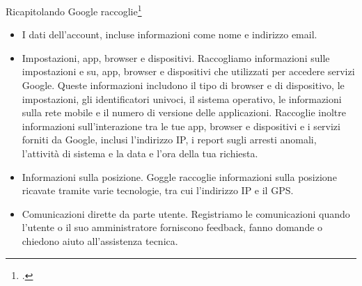 Ricapitolando Google raccoglie\footcite{Google2022a}
\begin{itemize}
	\item I dati dell'account, incluse informazioni come nome e indirizzo email.
	\item Impostazioni, app, browser e dispositivi. Raccogliamo informazioni sulle  impostazioni e su, app, browser e dispositivi che utilizzati per accedere  servizi Google. Queste informazioni includono il tipo di browser e di dispositivo, le impostazioni, gli identificatori univoci, il sistema operativo, le informazioni sulla rete mobile e il numero di versione delle applicazioni. Raccoglie inoltre informazioni sull'interazione tra le tue app, browser e dispositivi e i servizi forniti da Google, inclusi l'indirizzo IP, i report sugli arresti anomali, l'attività di sistema e la data e l'ora della tua richiesta.
	\item Informazioni sulla posizione. Goggle raccoglie informazioni sulla posizione ricavate tramite varie tecnologie, tra cui l'indirizzo IP e il GPS.
	\item Comunicazioni dirette da parte utente. Registriamo le comunicazioni quando l'utente o il suo amministratore forniscono feedback, fanno domande o chiedono aiuto all'assistenza tecnica.
\end{itemize}
